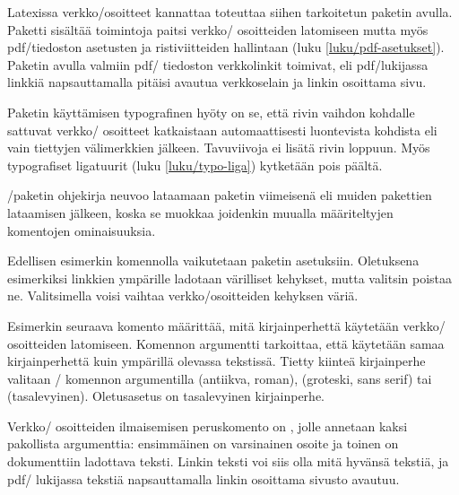 Latexissa verkko\-/osoitteet kannattaa toteuttaa siihen tarkoitetun
paketin avulla. Paketti  sisältää toimintoja
paitsi verkko\-/ osoitteiden latomiseen mutta myös pdf\-/tiedoston
asetusten ja ristiviitteiden hallintaan (luku \ref{luku/pdf-asetukset}).
Paketin avulla valmiin pdf\-/ tiedoston verkkolinkit toimivat, eli
pdf\-/lukijassa linkkiä napsauttamalla pitäisi avautua verkkoselain ja
linkin osoittama sivu.

Paketin käyttämisen typografinen hyöty on se, että rivin vaihdon
kohdalle sattuvat verkko\-/ osoitteet katkaistaan automaattisesti
luontevista kohdista eli vain tiettyjen välimerkkien jälkeen.
Tavuviivoja ei lisätä rivin loppuun. Myös typografiset ligatuurit (luku
\ref{luku/typo-liga}) kytketään pois päältä.

\-/paketin ohjekirja neuvoo lataamaan paketin
viimeisenä eli muiden pakettien lataamisen jälkeen, koska se
muokkaa joidenkin muualla määriteltyjen komentojen ominaisuuksia.

\begin{koodilohkosis}
\usepackage{hyperref}  %
\hypersetup{hidelinks} %
\end{koodilohkosis}

\noindent
Edellisen esimerkin komennolla  vaikutetaan
paketin asetuksiin. Oletuksena esimerkiksi linkkien ympärille
ladotaan värilliset kehykset, mutta valitsin  poistaa
ne. Valitsimella  voisi vaihtaa verkko\-/osoitteiden
kehyksen väriä.

Esimerkin seuraava komento  määrittää, mitä
kirjainperhettä käytetään verkko\-/ osoitteiden latomiseen. Komennon
argumentti  tarkoittaa, että käytetään samaa kirjainperhettä
kuin ympärillä olevassa tekstissä. Tietty kiinteä kirjainperhe valitaan
\-/ komennon argumentilla  (antiikva,
roman),  (groteski, sans serif) tai  (tasalevyinen).
Oletusasetus on tasalevyinen kirjainperhe.

Verkko\-/ osoitteiden ilmaisemisen peruskomento on ,
jolle annetaan kaksi pakollista argumenttia: ensimmäinen on varsinainen
osoite ja toinen on dokumenttiin ladottava teksti. Linkin teksti voi
siis olla mitä hyvänsä tekstiä, ja pdf\-/ lukijassa tekstiä
napsauttamalla linkin osoittama sivusto avautuu.

